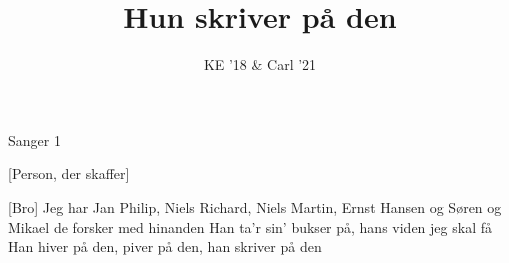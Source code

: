 \documentclass[a4paper,11pt]{article}
\author{KE '18 \& Carl '21}
\title{Hun skriver på den}
\begin{document}
\maketitle
\begin{roles}
 Sanger 1
\end{roles}
\begin{props}
[Person, der skaffer]
\end{props}
\begin{song}
[Bro] Jeg har Jan Philip, Niels Richard, Niels Martin, Ernst Hansen
og Søren og Mikael de forsker med hinanden
Han ta'r sin' bukser på, hans viden jeg skal få
Han hiver på den, piver på den, han skriver på den


\end{song}
\end{document}
